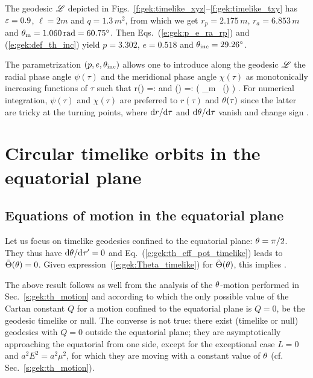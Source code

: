 \begin{texample}{}{}
The geodesic $\mathscr{L}$ depicted in Figs.~\ref{f:gek:timelike_xyz}--\ref{f:gek:timelike_txy}
has $\varepsilon=0.9$, $\ell=2 m$ and $q=1.3\, m^2$, from which we get
$r_p = 2.175\, m$,
$r_a = 6.853\, m$ and $\theta_{\rm m} = 1.060\, {\rm rad} = 60.75^\circ$.
Then Eqs.~(\ref{e:gek:p_e_ra_rp}) and (\ref{e:gek:def_th_inc}) yield
$p=3.302$, $e=0.518$ and $\theta_{\rm inc} = 29.26^\circ$.
\end{texample}

The parametrization $(p, e, \theta_{\rm inc})$ allows one to introduce
along the geodesic $\mathscr{L}$ the radial phase angle $\psi(\tau)$ and the
meridional phase angle $\chi(\tau)$ as monotonically increasing functions
of $\tau$ such that
\be
    r(\tau) =:  \qquad\mbox{and}\qquad
    \th(\tau) =: \arccos\left( \cos\th_{\rm m} \, \cos\chi(\tau) \right) .
\ee
For numerical integration, $\psi(\tau)$ and $\chi(\tau)$ are preferred
to $r(\tau)$ and $\theta(\tau)$ since the latter are tricky at the
turning points, where $\mathrm{d} r/\mathrm{d}\tau$ and $\mathrm{d}\theta/\mathrm{d}\tau$ vanish and change sign
\cite{DrascH04}.


\section{Circular timelike orbits in the equatorial plane} \label{s:gek:circ_equat}

\subsection{Equations of motion in the equatorial plane}

Let us focus on timelike geodesics confined to the equatorial plane:
$\theta=\pi/2$. They thus have $\mathrm{d}\theta/\mathrm{d}\tau' = 0$ and Eq.~(\ref{e:gek:th_eff_pot_timelike})
leads to $\tilde{\Theta}(\theta) = 0$. Given expression~(\ref{e:gek:Theta_timelike}) for $\tilde{\Theta}(\theta)$, this
implies
\be \label{e:gek_equat_q_zero}
    .
\ee
\begin{remark}
The above result follows as well from the analysis of the $\theta$-motion performed
in Sec.~\ref{s:gek:th_motion} and according to which the only possible value of
the Cartan constant $Q$
for a motion confined to the equatorial plane is $Q=0$, be the geodesic timelike or null.
The converse is not true: there exist (timelike or null) geodesics with $Q=0$ outside the equatorial
plane; they are asymptotically approaching the equatorial from one side, except for
the exceptional case $L=0$ and $a^2 E^2 = a^2 \mu^2$, for which they are moving with
a constant value of $\theta$ (cf. Sec.~\ref{s:gek:th_motion}).
\end{remark}


